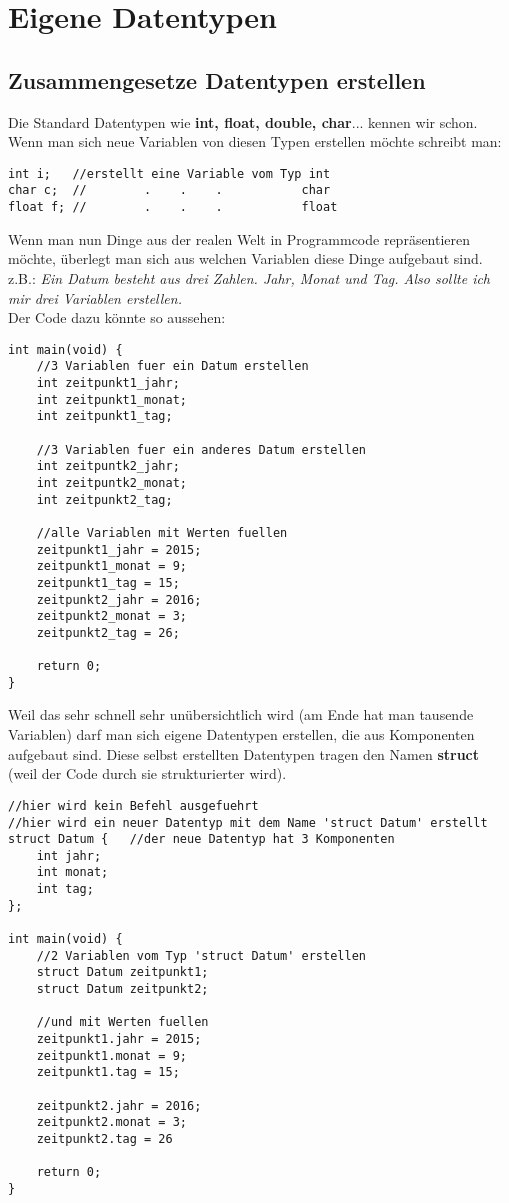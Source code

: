 \documentclass[c_worksheet.tex]{subfiles}
\begin{document}
  
\chapter{Eigene Datentypen}

\section{Zusammengesetze Datentypen erstellen}

Die Standard Datentypen wie \textbf{int, float, double, char}... kennen wir schon. Wenn man sich neue Variablen von diesen Typen erstellen möchte schreibt man:
\begin{lstlisting}
int i;   //erstellt eine Variable vom Typ int
char c;  //        .    .    .           char
float f; //        .    .    .           float
\end{lstlisting}

Wenn man nun Dinge aus der realen Welt in Programmcode repräsentieren möchte, überlegt man sich aus welchen Variablen diese Dinge aufgebaut sind.\\
z.B.: \textit{Ein Datum besteht aus drei Zahlen. Jahr, Monat und Tag. Also sollte ich mir drei Variablen erstellen.} \\

Der Code dazu könnte so aussehen:
\begin{lstlisting}
int main(void) {
    //3 Variablen fuer ein Datum erstellen
    int zeitpunkt1_jahr;
    int zeitpunkt1_monat;
    int zeitpunkt1_tag;

    //3 Variablen fuer ein anderes Datum erstellen
    int zeitpuntk2_jahr;
    int zeitpuntk2_monat;
    int zeitpunkt2_tag;

    //alle Variablen mit Werten fuellen
    zeitpunkt1_jahr = 2015;
    zeitpunkt1_monat = 9;
    zeitpunkt1_tag = 15;
    zeitpunkt2_jahr = 2016;
    zeitpunkt2_monat = 3;
    zeitpunkt2_tag = 26;

    return 0;
}
\end{lstlisting}

Weil das sehr schnell sehr unübersichtlich wird (am Ende hat man tausende Variablen) darf man sich eigene Datentypen erstellen, die aus Komponenten aufgebaut sind.
Diese selbst erstellten Datentypen tragen den Namen \textbf{struct} (weil der Code durch sie strukturierter wird).

\begin{lstlisting}
//hier wird kein Befehl ausgefuehrt
//hier wird ein neuer Datentyp mit dem Name 'struct Datum' erstellt
struct Datum {   //der neue Datentyp hat 3 Komponenten
    int jahr;
    int monat;
    int tag;
};

int main(void) {
    //2 Variablen vom Typ 'struct Datum' erstellen
    struct Datum zeitpunkt1;
    struct Datum zeitpunkt2;

    //und mit Werten fuellen
    zeitpunkt1.jahr = 2015;
    zeitpunkt1.monat = 9;
    zeitpunkt1.tag = 15;

    zeitpunkt2.jahr = 2016;
    zeitpunkt2.monat = 3;
    zeitpunkt2.tag = 26

    return 0;
}
\end{lstlisting}
\end{document}
